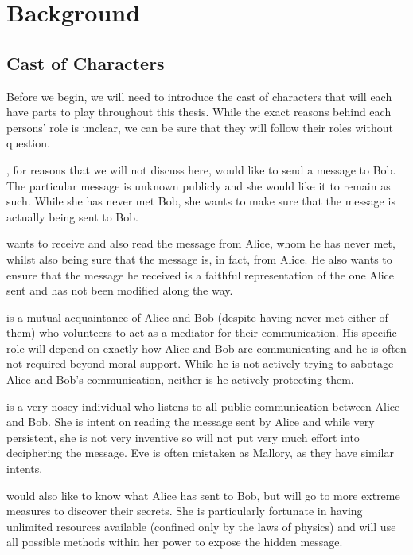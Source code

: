 %
%
\graphicspath{{./chapters/chapter02/fig02/}}

\let\textcircled=\pgftextcircled
\chapter{Background}
\label{chap:background}

\section{Cast of Characters}

Before we begin, we will need to introduce the cast of characters that will each have parts to play throughout this thesis. While the exact reasons behind each persons' role is unclear, we can be sure that they will follow their roles without question. 

, for reasons that we will not discuss here, would like to send a message to Bob. The particular message is unknown publicly and she would like it to remain as such. While she has never met Bob, she wants to make sure that the message is actually being sent to Bob.

 wants to receive and also read the message from Alice, whom he has never met, whilst also being sure that the message is, in fact, from Alice. He also wants to ensure that the message he received is a faithful representation of the one Alice sent and has not been modified along the way.

 is a mutual acquaintance of Alice and Bob (despite having never met either of them) who volunteers to act as a mediator for their communication. His specific role will depend on exactly how Alice and Bob are communicating and he is often not required beyond moral support. While he is not actively trying to sabotage Alice and Bob's communication, neither is he actively protecting them.

 is a very nosey individual who listens to all public communication between Alice and Bob. She is intent on reading the message sent by Alice and while very persistent, she is not very inventive so will not put very much effort into deciphering the message. Eve is often mistaken as Mallory, as they have similar intents.

 would also like to know what Alice has sent to Bob, but will go to more extreme measures to discover their secrets. She is particularly fortunate in having unlimited resources available (confined only by the laws of physics) and will use all possible methods within her power to expose the hidden message. 

